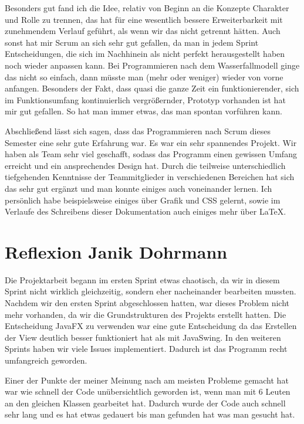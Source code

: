 Besonders gut fand ich die Idee, relativ von Beginn an die Konzepte Charakter und Rolle zu trennen, das hat für eine wesentlich bessere Erweiterbarkeit mit zunehmendem Verlauf geführt, als wenn wir das nicht getrennt hätten. Auch sonst hat mir Scrum an sich sehr gut gefallen, da man in jedem Sprint Entscheidungen, die sich im Nachhinein als nicht perfekt herausgestellt haben noch wieder anpassen kann. Bei Programmieren nach dem Wasserfallmodell ginge das nicht so einfach, dann müsste man (mehr oder weniger) wieder von vorne anfangen. Besonders der Fakt, dass quasi die ganze Zeit ein funktionierender, sich im Funktionsumfang kontinuierlich vergrößernder, Prototyp vorhanden ist hat mir gut gefallen. So hat man immer etwas, das man spontan vorführen kann. 

Abschließend lässt sich sagen, dass das Programmieren nach Scrum dieses Semester eine sehr gute Erfahrung war. Es war ein sehr spannendes Projekt. Wir haben als Team sehr viel geschafft, sodass das Programm einen gewissen Umfang erreicht und ein ansprechendes Design hat. Durch die teilweise unterschiedlich tiefgehenden Kenntnisse der Teammitglieder in verschiedenen Bereichen hat sich das sehr gut ergänzt und man konnte einiges auch voneinander lernen. Ich persönlich habe beispielsweise einiges über Grafik und CSS gelernt, sowie im Verlaufe des Schreibens dieser Dokumentation auch einiges mehr über LaTeX. 

\section{Reflexion Janik Dohrmann}

Die Projektarbeit begann im ersten Sprint etwas chaotisch, da wir in diesem Sprint nicht wirklich gleichzeitig, sondern eher nacheinander bearbeiten mussten. Nachdem wir den ersten Sprint abgeschlossen hatten, war dieses Problem nicht mehr vorhanden, da wir die Grundstrukturen des Projekts erstellt hatten. Die Entscheidung JavaFX zu verwenden war eine gute Entscheidung da das Erstellen der View deutlich besser funktioniert hat als mit JavaSwing. In den weiteren Sprints haben wir viele Issues implementiert. Dadurch ist das Programm recht umfangreich geworden.

Einer der Punkte der meiner Meinung nach am meisten Probleme gemacht hat war wie schnell der Code unübersichtlich geworden ist, wenn man mit 6 Leuten an den gleichen Klassen gearbeitet hat. Dadurch wurde der Code auch schnell sehr lang und es hat etwas gedauert bis man gefunden hat was man gesucht hat.

